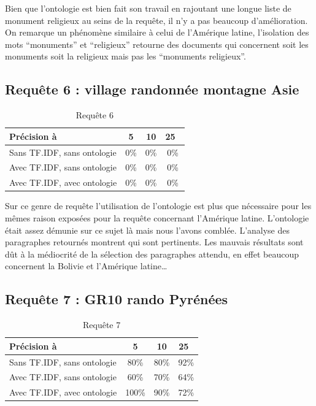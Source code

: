 \documentclass{article}
\begin{document}
Bien que l’ontologie est bien fait son travail en rajoutant une longue liste de
monument religieux au seins de la requête, il n’y a pas beaucoup d’amélioration. On
remarque un phénomène similaire à celui de l’Amérique latine, l’isolation des mots
“monuments” et “religieux” retourne des documents qui concernent soit les monuments
soit la religieux mais pas les “monuments religieux”.

\subsection{Requête 6 : \og village randonnée montagne Asie \fg }

\begin{table}[h!!]
    \centering
    \caption{Requête 6}
\begin{tabular}{|l|c|c|c|}
    \hline
    Précision à & 5 & 10 & 25 \\
    \hline
    Sans TF.IDF, sans ontologie & 0\% & 0\% & 0\% \\
    \hline
    Avec TF.IDF, sans ontologie & 0\% & 0\% & 0\% \\
    \hline
    Avec TF.IDF, avec ontologie & 0\% & 0\% & 0\% \\
    \hline
\end{tabular}
\end{table}

Sur ce genre de requête l’utilisation de l’ontologie est plus que nécessaire pour les
mêmes raison exposées pour la requête concernant l’Amérique latine. L’ontologie était
assez démunie sur ce sujet là mais nous l’avons comblée. L’analyse des paragraphes
retournés montrent qui sont pertinents. Les mauvais résultats sont dût à la
médiocrité de la sélection des paragraphes attendu, en effet beaucoup concernent la
Bolivie et l’Amérique latine…

\subsection{Requête 7 : \og GR10 rando Pyrénées \fg }

\begin{table}[h!!!]
    \centering
    \caption{Requête 7}
\begin{tabular}{|l|c|c|c|}
    \hline
    Précision à & 5 & 10 & 25 \\
    \hline
    Sans TF.IDF, sans ontologie & 80\% & 80\% & 92\% \\
    \hline
    Avec TF.IDF, sans ontologie & 60\% & 70\% & 64\% \\
    \hline
    Avec TF.IDF, avec ontologie & 100\% & 90\% & 72\% \\
    \hline
\end{tabular}
\end{table}
\end{document}
